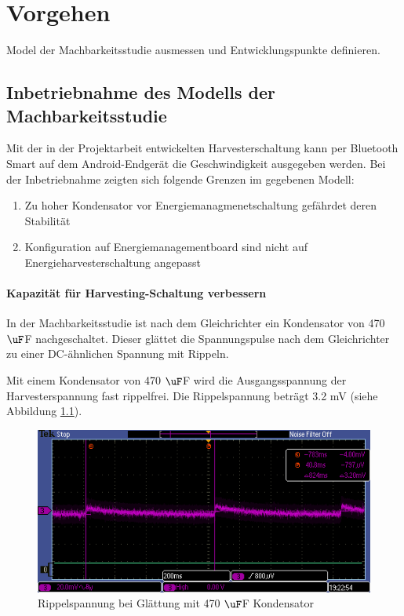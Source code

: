\chapter{Vorgehen}
Model der Machbarkeitsstudie ausmessen und Entwicklungspunkte definieren.

\section{Inbetriebnahme des Modells der Machbarkeitsstudie}
Mit der in der Projektarbeit entwickelten Harvesterschaltung kann per Bluetooth Smart auf dem Android-Endgerät die Geschwindigkeit ausgegeben werden.
Bei der Inbetriebnahme zeigten sich folgende Grenzen im gegebenen Modell:

\begin{enumerate}
    \item Zu hoher Kondensator vor Energiemanagmenetschaltung gefährdet deren Stabilität
    \item Konfiguration auf Energiemanagementboard sind nicht auf Energieharvesterschaltung angepasst
\end{enumerate}


\subsubsection{Kapazität für Harvesting-Schaltung verbessern}
In der Machbarkeitsstudie ist nach dem Gleichrichter ein Kondensator von 470 $\uF $F nachgeschaltet. Dieser glättet die Spannungspulse nach dem Gleichrichter zu einer DC-ähnlichen Spannung mit Rippeln.

Mit einem Kondensator von 470 $\uF $F wird die Ausgangsspannung der Harvesterspannung fast rippelfrei. Die Rippelspannung beträgt 3.2 mV (siehe Abbildung \ref{kond470uF}).
\begin{figure}
    \includegraphics[bb = 0 0 100 100]{3Vorgehen/imag/470uF.PNG}
    \caption{Rippelspannung bei Glättung mit 470 $\uF $F Kondensator}\label{kond470uF} 
\end{figure}

